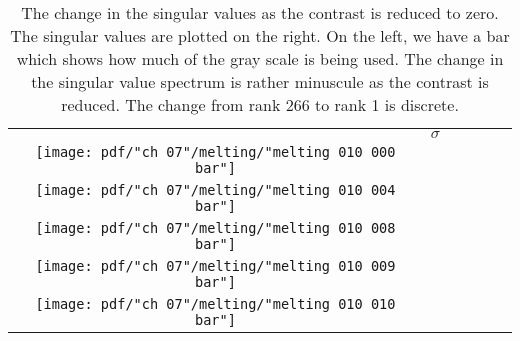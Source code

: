 \begin{table}[htdp]
\begin{center}
\begin{tabular}{cccccc}
  & $\sigma$ \\
  \texttt{[image: pdf/"ch 07"/melting/"melting 010 000 bar"]}&
  \includegraphics[ width = 2.00in ]  {pdf/"ch 07"/melting/"melting 010 000 singular values"} \\
  \texttt{[image: pdf/"ch 07"/melting/"melting 010 004 bar"]}&
  \includegraphics[ width = 2.00in ]  {pdf/"ch 07"/melting/"melting 010 004 singular values"} \\
  \texttt{[image: pdf/"ch 07"/melting/"melting 010 008 bar"]}&
  \includegraphics[ width = 2.00in ]  {pdf/"ch 07"/melting/"melting 010 008 singular values"} \\
  \texttt{[image: pdf/"ch 07"/melting/"melting 010 009 bar"]}&
  \includegraphics[ width = 2.00in ]  {pdf/"ch 07"/melting/"melting 010 009 singular values"} \\
  \texttt{[image: pdf/"ch 07"/melting/"melting 010 010 bar"]}&
  \includegraphics[ width = 2.00in ]  {pdf/"ch 07"/melting/"melting 010 010 singular values"} \\
\end{tabular}
\end{center}
\label{tab:jordan:images:melt:2}
\caption[Reducing contrast: singular values]{The change in the singular values as the contrast is reduced to zero. The singular values are plotted on the right. On the left, we have a bar which shows how much of the gray scale is being used. The change in the singular value spectrum is rather minuscule as the contrast is reduced. The change from rank 266 to rank 1 is discrete.}
\end{table}%


\endinput